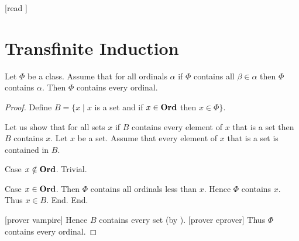 \documentclass[10pt]{article}
\begin{document}
  \begin{imports}
    \begin{forthel}
      [read ]
    \end{forthel}
  \end{imports}


  \section*{Transfinite Induction}

  \begin{forthel}
    \begin{theorem}[id=SET_THEORY_02_8493935460614144,printid]
      Let $\Phi$ be a class.
      Assume that for all ordinals $\alpha$ if $\Phi$ contains all $\beta \in \alpha$ then $\Phi$ contains $\alpha$.
      Then $\Phi$ contains every ordinal.
    \end{theorem}
    \begin{proof}
      Define $B = \{ x \mid x$ is a set and if $x \in \textbf{Ord}$ then $x \in \Phi \}$.

      Let us show that for all sets $x$ if $B$ contains every element of $x$ that is a set then $B$ contains $x$.
        Let $x$ be a set.
        Assume that every element of $x$ that is a set is contained in $B$.

        Case $x \notin \textbf{Ord}$. Trivial.

        Case $x \in \textbf{Ord}$.
          Then $\Phi$ contains all ordinals less than $x$.
          Hence $\Phi$ contains $x$.
          Thus $x \in B$.
        End.
      End.

      [prover vampire]
      Hence $B$ contains every set (by ).
      [prover eprover]
      Thus $\Phi$ contains every ordinal.
    \end{proof}
  \end{forthel}
\end{document}
